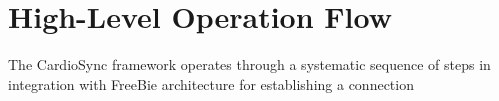 \section{High-Level Operation Flow}

\noindent The CardioSync framework operates through a systematic sequence of steps in integration with FreeBie architecture for establishing a connection

